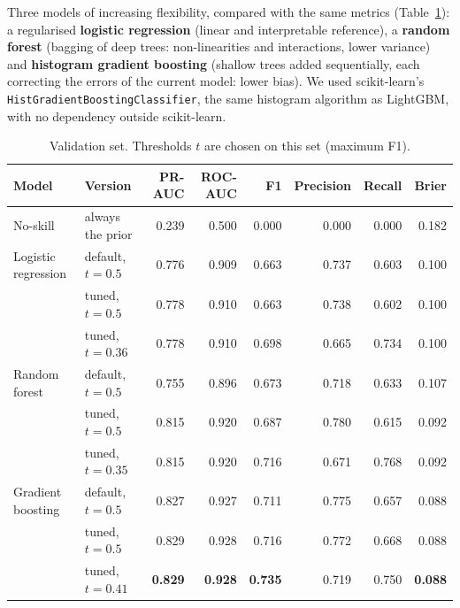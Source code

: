 \documentclass[11pt,a4paper]{article}
\newcommand{\code}[1]{\texttt{#1}}
\begin{document}
Three models of increasing flexibility, compared with the same metrics (Table~\ref{tab:val}):
a regularised \textbf{logistic regression} (linear and interpretable reference), a \textbf{random
forest} (bagging of deep trees: non-linearities and interactions, lower variance) and
\textbf{histogram gradient boosting} (shallow trees added sequentially, each correcting the errors
of the current model: lower bias). We used scikit-learn's \code{HistGradientBoostingClassifier}, the
same histogram algorithm as LightGBM, with no dependency outside scikit-learn.

\begin{table}[H]\centering\small
\begin{tabular}{llrrrrrr}\toprule
Model & Version & PR-AUC & ROC-AUC & F1 & Precision & Recall & Brier\\\midrule
No-skill & always the prior & 0.239 & 0.500 & 0.000 & 0.000 & 0.000 & 0.182\\\midrule
Logistic regression & default, $t=0.5$ & 0.776 & 0.909 & 0.663 & 0.737 & 0.603 & 0.100\\
 & tuned, $t=0.5$ & 0.778 & 0.910 & 0.663 & 0.738 & 0.602 & 0.100\\
 & tuned, $t=0.36$ & 0.778 & 0.910 & 0.698 & 0.665 & 0.734 & 0.100\\\midrule
Random forest & default, $t=0.5$ & 0.755 & 0.896 & 0.673 & 0.718 & 0.633 & 0.107\\
 & tuned, $t=0.5$ & 0.815 & 0.920 & 0.687 & 0.780 & 0.615 & 0.092\\
 & tuned, $t=0.35$ & 0.815 & 0.920 & 0.716 & 0.671 & 0.768 & 0.092\\\midrule
Gradient boosting & default, $t=0.5$ & 0.827 & 0.927 & 0.711 & 0.775 & 0.657 & 0.088\\
 & tuned, $t=0.5$ & 0.829 & 0.928 & 0.716 & 0.772 & 0.668 & 0.088\\
 & tuned, $t=0.41$ & \textbf{0.829} & \textbf{0.928} & \textbf{0.735} & 0.719 & 0.750 & \textbf{0.088}\\\bottomrule
\end{tabular}
\caption{Validation set. Thresholds $t$ are chosen on this set (maximum F1).}\label{tab:val}
\end{table}
\end{document}
